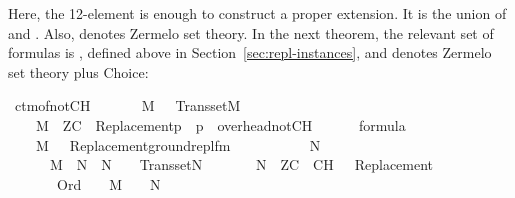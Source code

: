 Here, the 12-element  is enough to construct a proper
extension. It is  the union of
 and
.
Also,
 denotes Zermelo set theory. In the
next theorem, the relevant set of formulas is
, defined above in
Section~\ref{sec:repl-instances}, and  denotes Zermelo set
theory plus Choice:

\begin{isabelle}
\isamarkupfalse%
\ ctm{\isacharunderscore}{\kern0pt}of{\isacharunderscore}{\kern0pt}not{\isacharunderscore}{\kern0pt}CH{\isacharcolon}{\kern0pt}\isanewline
\ \ \isanewline
\ \ \ \ {\isachardoublequoteopen}M\ {\isasymapprox}\ {\isasymomega}{\isachardoublequoteclose}\ {\isachardoublequoteopen}Transset{\isacharparenleft}{\kern0pt}M{\isacharparenright}{\kern0pt}{\isachardoublequoteclose}\isanewline
\ \ \ \ {\isachardoublequoteopen}M\ {\isasymTurnstile}\ ZC\ {\isasymunion}\ {\isacharbraceleft}{\kern0pt}{\isasymcdot}Replacement{\isacharparenleft}{\kern0pt}p{\isacharparenright}{\kern0pt}{\isasymcdot}\ {\isachardot}{\kern0pt}\ p\ {\isasymin}\ overhead{\isacharunderscore}{\kern0pt}notCH{\isacharbraceright}{\kern0pt}{\isachardoublequoteclose}\isanewline
\ \ \ \ {\isachardoublequoteopen}{\isasymPhi}\ {\isasymsubseteq}\ formula{\isachardoublequoteclose}\isanewline
\ \ \ \ {\isachardoublequoteopen}M\ {\isasymTurnstile}\ {\isacharbraceleft}{\kern0pt}\ {\isasymcdot}Replacement{\isacharparenleft}{\kern0pt}ground{\isacharunderscore}{\kern0pt}repl{\isacharunderscore}{\kern0pt}fm{\isacharparenleft}{\kern0pt}{\isasymphi}{\isacharparenright}{\kern0pt}{\isacharparenright}{\kern0pt}{\isasymcdot}\ {\isachardot}{\kern0pt}\ {\isasymphi}\ {\isasymin}\ {\isasymPhi}{\isacharbraceright}{\kern0pt}{\isachardoublequoteclose}\isanewline
\ \ \isanewline
\ \ \ \ {\isachardoublequoteopen}{\isasymexists}N{\isachardot}{\kern0pt}\isanewline
\ \ \ \ \ \ M\ {\isasymsubseteq}\ N\ {\isasymand}\ N\ {\isasymapprox}\ {\isasymomega}\ {\isasymand}\ Transset{\isacharparenleft}{\kern0pt}N{\isacharparenright}{\kern0pt}\ {\isasymand}\isanewline
\ \ \ \ \ \ N\ {\isasymTurnstile}\ ZC\ {\isasymunion}\ {\isacharbraceleft}{\kern0pt}{\isasymcdot}{\isasymnot}{\isasymcdot}CH{\isasymcdot}{\isasymcdot}{\isacharbraceright}{\kern0pt}\ {\isasymunion}\ {\isacharbraceleft}{\kern0pt}\ {\isasymcdot}Replacement{\isacharparenleft}{\kern0pt}{\isasymphi}{\isacharparenright}{\kern0pt}{\isasymcdot}\ {\isachardot}{\kern0pt}\ {\isasymphi}\ {\isasymin}\ {\isasymPhi}{\isacharbraceright}{\kern0pt}\ {\isasymand}\isanewline
\ \ \ \ \ \ {\isacharparenleft}{\kern0pt}{\isasymforall}{\isasymalpha}{\isachardot}{\kern0pt}\ Ord{\isacharparenleft}{\kern0pt}{\isasymalpha}{\isacharparenright}{\kern0pt}\ {\isasymlongrightarrow}\ {\isacharparenleft}{\kern0pt}{\isasymalpha}\ {\isasymin}\ M\ {\isasymlongleftrightarrow}\ {\isasymalpha}\ {\isasymin}\ N{\isacharparenright}{\kern0pt}{\isacharparenright}{\kern0pt}{\isachardoublequoteclose}
\end{isabelle}

